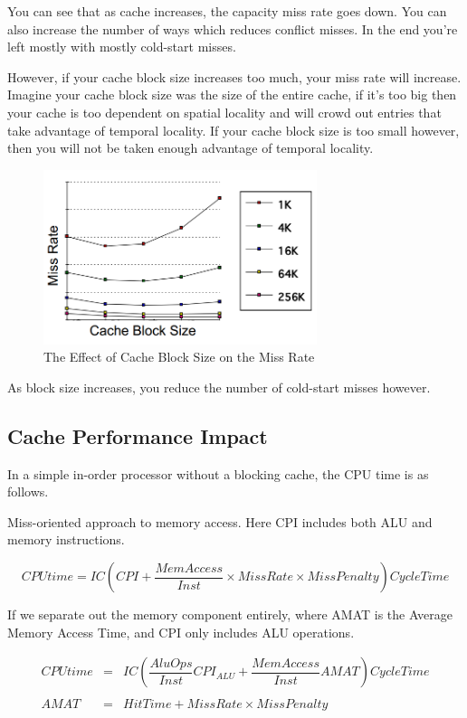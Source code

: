 \documentclass{article}
\begin{document}
You can see that as cache increases, the capacity miss rate goes down. You can also increase the number of ways which reduces conflict misses. In the end you're left mostly with mostly cold-start misses. 

However, if your cache block size increases too much, your miss rate will increase. Imagine your cache block size was the size of the entire cache, if it's too big then your cache is too dependent on spatial locality and will crowd out entries that take advantage of temporal locality. If your cache block size is too small however, then you will not be taken enough advantage of temporal locality. 


\begin{figure}[H]
\centering
\includegraphics[width=80mm]{img/blocksize.png}
\caption{The Effect of Cache Block Size on the Miss Rate}
\end{figure}

As block size increases, you reduce the number of cold-start misses however.

\subsection{Cache Performance Impact}

In a simple in-order processor without a blocking cache, the CPU time is as follows. 

Miss-oriented approach to memory access. Here CPI includes both ALU and memory instructions.

\begin{equation}
CPUtime = IC \left(CPI + \frac{MemAccess}{Inst} \times MissRate \times MissPenalty \right) CycleTime
\end{equation}

If we separate out the memory component entirely, where AMAT is the Average Memory Access Time, and CPI only includes ALU operations. 


\begin{equation}
\begin{array}{rcl}
CPUtime & = & IC \left(\dfrac{AluOps}{Inst} CPI_{ALU} + \dfrac{MemAccess}{Inst} AMAT \right) CycleTime \\ 
\\
AMAT & = & HitTime + MissRate \times MissPenalty \\
\end{array}
\end{equation}
\end{document}
